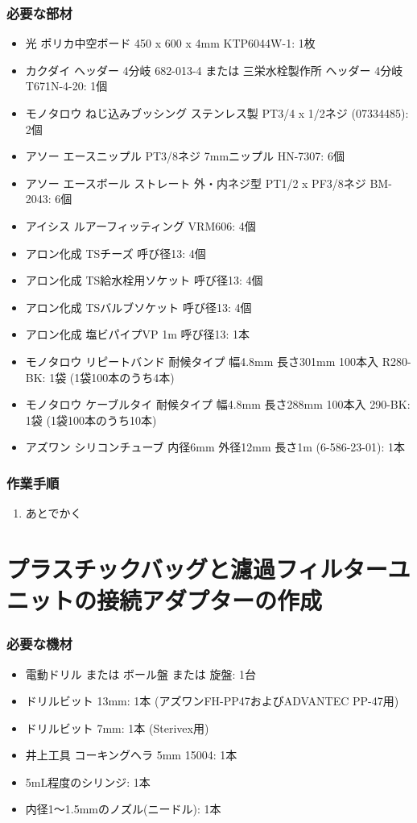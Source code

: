 \documentclass[titlepage,10pt,a4paper,uplatex]{jsbook}
\begin{document}
\subsubsection{必要な部材}
\begin{itemize}
\item 光 ポリカ中空ボード 450 x 600 x 4mm KTP6044W-1: 1枚
\item カクダイ ヘッダー 4分岐 682-013-4 または 三栄水栓製作所 ヘッダー 4分岐 T671N-4-20: 1個
\item モノタロウ ねじ込みブッシング ステンレス製 PT3/4 x 1/2ネジ (07334485): 2個
\item アソー エースニップル PT3/8ネジ 7mmニップル HN-7307: 6個
\item アソー エースボール ストレート 外・内ネジ型 PT1/2 x PF3/8ネジ BM-2043: 6個
\item アイシス ルアーフィッティング VRM606: 4個
\item アロン化成 TSチーズ 呼び径13: 4個
\item アロン化成 TS給水栓用ソケット 呼び径13: 4個
\item アロン化成 TSバルブソケット 呼び径13: 4個
\item アロン化成 塩ビパイプVP 1m 呼び径13: 1本
\item モノタロウ リピートバンド 耐候タイプ 幅4.8mm 長さ301mm 100本入 R280-BK: 1袋 (1袋100本のうち4本)
\item モノタロウ ケーブルタイ 耐候タイプ 幅4.8mm 長さ288mm 100本入 290-BK: 1袋 (1袋100本のうち10本)
\item アズワン シリコンチューブ 内径6mm 外径12mm 長さ1m (6-586-23-01): 1本
\end{itemize}

\subsubsection{作業手順}
\begin{enumerate}
\item あとでかく
\end{enumerate}

\section{プラスチックバッグと濾過フィルターユニットの接続アダプターの作成}\label{makingfilteradapter}

\subsubsection{必要な機材}
\begin{itemize}
\item 電動ドリル または ボール盤 または 旋盤: 1台
\item ドリルビット 13mm: 1本 (アズワンFH-PP47およびADVANTEC PP-47用)
\item ドリルビット 7mm: 1本 (Sterivex用)
\item 井上工具 コーキングヘラ 5mm 15004: 1本
\item 5mL程度のシリンジ: 1本
\item 内径1～1.5mmのノズル(ニードル): 1本
\end{itemize}
\end{document}
